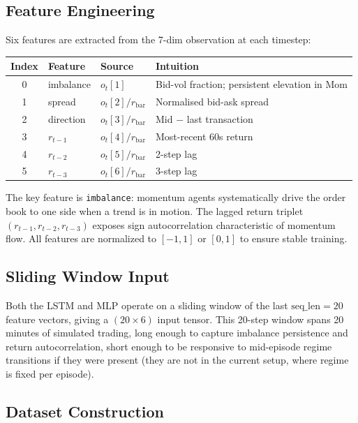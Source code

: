 \documentclass[11pt]{article}
\begin{document}
\subsection{Feature Engineering}

Six features are extracted from the 7-dim observation at each timestep:

\begin{center}
\begin{tabular}{clll}
\toprule
\textbf{Index} & \textbf{Feature} & \textbf{Source} & \textbf{Intuition} \\
\midrule
0 & imbalance  & $o_t[1]$          & Bid-vol fraction; persistent elevation in Mom \\
1 & spread     & $o_t[2] / r_\text{bar}$ & Normalised bid-ask spread \\
2 & direction  & $o_t[3] / r_\text{bar}$ & Mid $-$ last transaction \\
3 & $r_{t-1}$  & $o_t[4] / r_\text{bar}$ & Most-recent 60s return \\
4 & $r_{t-2}$  & $o_t[5] / r_\text{bar}$ & 2-step lag \\
5 & $r_{t-3}$  & $o_t[6] / r_\text{bar}$ & 3-step lag \\
\bottomrule
\end{tabular}
\end{center}

\noindent
The key feature is \texttt{imbalance}: momentum agents systematically drive
the order book to one side when a trend is in motion.  The lagged return
triplet $(r_{t-1}, r_{t-2}, r_{t-3})$ exposes sign autocorrelation
characteristic of momentum flow.  All features are normalized to $[-1, 1]$ or
$[0, 1]$ to ensure stable training.

\subsection{Sliding Window Input}

Both the LSTM and MLP operate on a sliding window of the last
$\text{seq\_len} = 20$ feature vectors, giving a $(20 \times 6)$ input
tensor.  This 20-step window spans 20 minutes of simulated trading, long
enough to capture imbalance persistence and return autocorrelation, short
enough to be responsive to mid-episode regime transitions if they were present
(they are not in the current setup, where regime is fixed per episode).

\subsection{Dataset Construction}
\end{document}
